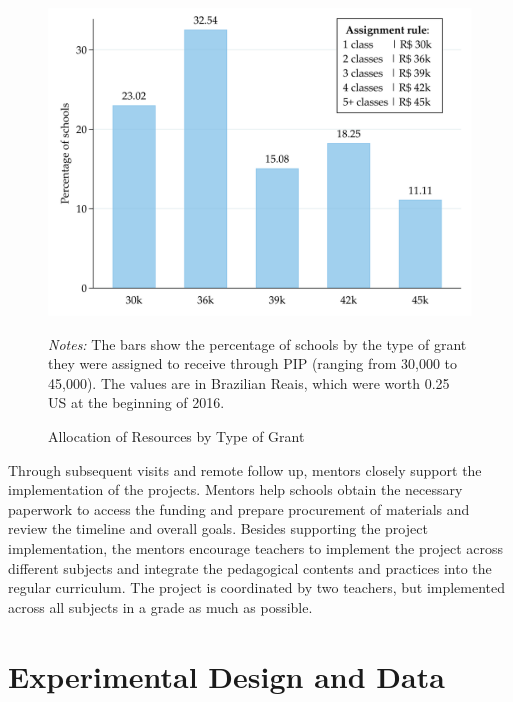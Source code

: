 \documentclass[11pt,a4paper]{article}
\begin{document}
	\vspace{6pt}
	
	\begin{figure}[ht!]
		\caption{Allocation of Resources by Type of Grant}
		\label{fig:grant}
		\centering
		
		\includegraphics[width=13cm]{DataWork/Output/Figures/fig3-grant.png}
		
		\begin{minipage}{0.8\textwidth}
			\small{\textit{Notes:} The bars show the percentage of schools by the type of grant they were assigned to receive through PIP (ranging from 30,000 to 45,000). The values are in Brazilian Reais, which were worth 0.25 US at the beginning of 2016.}
		\end{minipage}
		
	\end{figure}
	
	Through subsequent visits and remote follow up, mentors closely support the implementation of the projects. Mentors help schools obtain the necessary paperwork to access the funding and prepare procurement of materials and review the timeline and overall goals. Besides supporting the project implementation, the mentors encourage teachers to implement the project across different subjects and integrate the pedagogical contents and practices into the regular curriculum. The project is coordinated by two teachers, but implemented across all subjects in a grade as much as possible. 
	
	
	
	\section{Experimental Design and Data} \label{sec:design_data}
	
\end{document}
